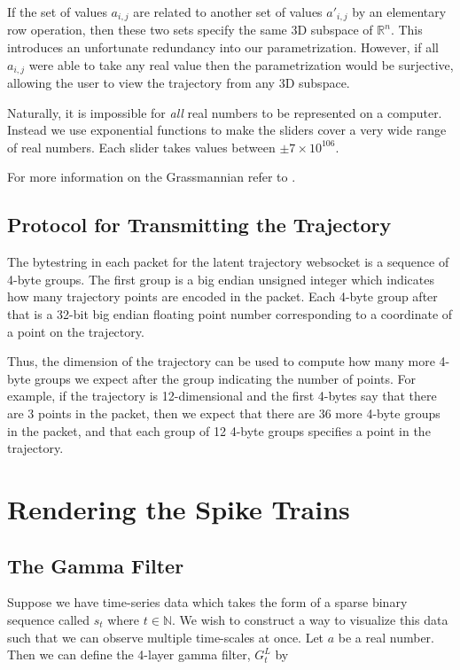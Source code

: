 \documentclass[12pt, openany]{book}
\begin{document}
If the set of values $a_{i,j}$ are related to another set of values $a'_{i,j}$ by an elementary row operation, then these two sets specify the same 3D subspace of $\mathbb{R}^n$. This introduces an unfortunate redundancy into our parametrization. However, if all $a_{i,j}$ were able to take any real value then the parametrization would be surjective, allowing the user to view the trajectory from any 3D subspace.

Naturally, it is impossible for \textit{all} real numbers to be represented on a computer. Instead we use exponential functions to make the sliders cover a very wide range of real numbers. Each slider takes values between $\pm 7\times 10^{106}$.

For more information on the Grassmannian refer to \cite{grassmannian}.

\section{Protocol for Transmitting the Trajectory}

The bytestring in each packet for the latent trajectory websocket is a sequence of 4-byte groups. The first group is a big endian unsigned integer which indicates how many trajectory points are encoded in the packet. Each 4-byte group after that is a 32-bit big endian floating point number corresponding to a coordinate of a point on the trajectory.

Thus, the dimension of the trajectory can be used to compute how many more 4-byte groups we expect after the group indicating the number of points. For example, if the trajectory is 12-dimensional and the first 4-bytes say that there are 3 points in the packet, then we expect that there are 36 more 4-byte groups in the packet, and that each group of 12 4-byte groups specifies a point in the trajectory.

\chapter{Rendering the Spike Trains}

\section{The Gamma Filter}

Suppose we have time-series data which takes the form of a sparse binary sequence called $s_t$ where $t\in\mathbb{N}$. We wish to construct a way to visualize this data such that we can observe multiple time-scales at once. Let $a$ be a real number. Then we can define the 4-layer gamma filter, $G_t^L$ by
\end{document}
